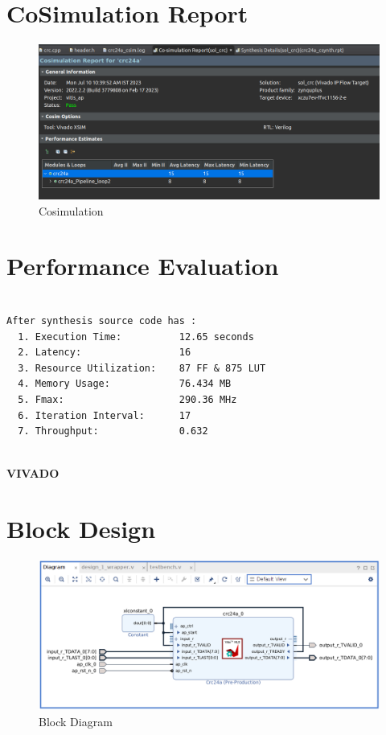 \documentclass{article}
\begin{document}
\section{CoSimulation Report}
\vspace{1cm}
\begin{figure}[h]
    \centering
\includegraphics[width=1.1\textwidth]{figs/p13.png}
    \caption{Cosimulation}
    \label{fig:my_label}
\end{figure}

\vspace{15cm}


\section{Performance Evaluation}
\begin{lstlisting}

After synthesis source code has :
  1. Execution Time:          12.65 seconds
  2. Latency:                 16 
  3. Resource Utilization:    87 FF & 875 LUT
  4. Memory Usage:            76.434 MB
  5. Fmax:                    290.36 MHz
  6. Iteration Interval:      17
  7. Throughput:              0.632
 

\end{lstlisting}
\vspace{1cm}


\maketitle
\hfill \textbf{VIVADO}
\section{Block Design}
\vspace{1cm}
\begin{figure}[h]
    \centering
\includegraphics[width=\columnwidth]{figs/p1bd.png}
    \caption{Block Diagram}
    \label{fig:my_label}
\end{figure}
\vspace{13cm}
\end{document}
